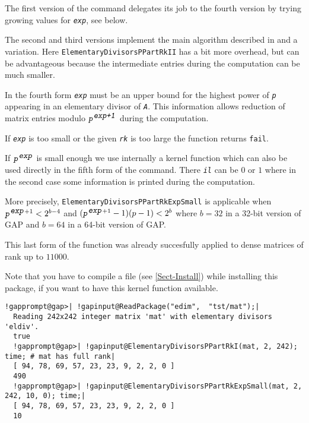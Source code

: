 \documentclass[a4paper,11pt]{report}
\begin{document}
{{{ The first version of the command delegates its job to the fourth version by
trying growing values for \mbox{\texttt{\mdseries\slshape exp}}, see below. 

 The second and third versions implement the main algorithm described in \cite{L98} and a variation. Here \texttt{ElementaryDivisorsPPartRkII} has a bit more overhead, but can be advantageous because the intermediate
entries during the computation can be much smaller.

 In the fourth form \mbox{\texttt{\mdseries\slshape exp}} must be an upper bound for the highest power of \mbox{\texttt{\mdseries\slshape p}} appearing in an elementary divisor of \mbox{\texttt{\mdseries\slshape A}}. This information allows reduction of matrix entries modulo $\mbox{\texttt{\mdseries\slshape p}}^{{\mbox{\texttt{\mdseries\slshape exp+1}}}}$ during the computation. 

 If \mbox{\texttt{\mdseries\slshape exp}} is too small or the given \mbox{\texttt{\mdseries\slshape rk}} is too large the function returns \texttt{fail}. 

 If $\mbox{\texttt{\mdseries\slshape p}}^{\mbox{\texttt{\mdseries\slshape exp}}}$ is small enough we use internally a kernel function which can also be used
directly in the fifth form of the command. There \mbox{\texttt{\mdseries\slshape il}} can be $0$ or $1$ where in the second case some information is printed during the computation.

 More precisely, \texttt{ElementaryDivisorsPPartRkExpSmall} is applicable when $\mbox{\texttt{\mdseries\slshape p}}^{{\mbox{\texttt{\mdseries\slshape exp}}+1}} < 2^{{b-4}}$ and $(\mbox{\texttt{\mdseries\slshape p}}^{{\mbox{\texttt{\mdseries\slshape exp}}+1}} - 1)(p-1) < 2^b$ where $b=32$ in a 32-bit version of \textsf{GAP} and $b=64$ in a 64-bit version of \textsf{GAP}.

 This last form of the function was already succesfully applied to dense
matrices of rank up to $11000$.

 Note that you have to compile a file (see \ref{Sect-Install}) while installing this package, if you want to have this kernel function
available.

 
\begin{Verbatim}[commandchars=!@|,fontsize=\small,frame=single,label=Example]
  !gapprompt@gap>| !gapinput@ReadPackage("edim",  "tst/mat");|
  Reading 242x242 integer matrix 'mat' with elementary divisors 'eldiv'.
  true
  !gapprompt@gap>| !gapinput@ElementaryDivisorsPPartRkI(mat, 2, 242); time; # mat has full rank|
  [ 94, 78, 69, 57, 23, 23, 9, 2, 2, 0 ]
  490
  !gapprompt@gap>| !gapinput@ElementaryDivisorsPPartRkExpSmall(mat, 2, 242, 10, 0); time;|
  [ 94, 78, 69, 57, 23, 23, 9, 2, 2, 0 ]
  10
\end{Verbatim}
 }

}}
\end{document}
